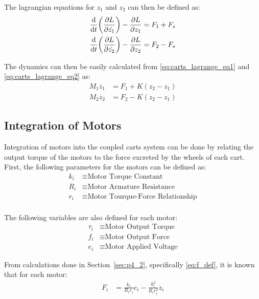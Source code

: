 \documentclass[]{article}
\newcommand{\sectionname}{Section}
\begin{document}
		The lagrangian equations for $z_1$ and $z_2$ can then be defined as:
		\begin{align}
			\dv{t}\qty(\pdv{L}{\dot{z_1}}) - \pdv{L}{z_1} &= F_1 + F_s \label{eq:carts_lagrange_eq1}\\
			\dv{t}\qty(\pdv{L}{\dot{z_2}}) - \pdv{L}{z_2} &= F_2 - F_s \label{eq:carts_lagrange_eq2}
		\end{align}	
		
		The dynamics can then be easily calculated from \eqref{eq:carts_lagrange_eq1} and \eqref{eq:carts_lagrange_eq2} as:
		\begin{align}
			M_1 \ddot{z_1} &= F_1 + K(z_2 - z_1) \label{eq:carts_state_eq1}\\
			M_2 \ddot{z_2} &= F_2 - K(z_2 - z_1) \label{eq:carts_state_eq2}
		\end{align}
		
	\subsection{Integration of Motors}
		Integration of motors into the coupled carts system can be done by relating the output torque of the motors to the force excreted by the wheels of each cart.\\
		
		First, the following parameters for the motors can be defined as:
		\begin{align*}
			k_i &\equiv \text{Motor Torque Constant}\\
			R_i &\equiv \text{Motor Armature Resistance}\\
			r_i &\equiv \text{Motor Tourque-Force Relationship}\\
		\end{align*}
		
		The following variables are also defined for each motor:
		\begin{align*}
			\tau_i &\equiv \text{Motor Output Torque}\\
			f_i &\equiv \text{Motor Output Force}\\
			e_i &\equiv \text{Motor Applied Voltage}
		\end{align*}
		
		From calculations done in \sectionname \ \ref{sec:p4_2}, specifically \eqref{eq:f_def}, it is known that for each motor:
		\begin{align}
			F_i &= \frac{k_i}{R_i r_i} e_i - \frac{k_i^2}{R_i r_i^2} \dot{z_i} \label{eq:carts_f_def}
		\end{align}
\end{document}

